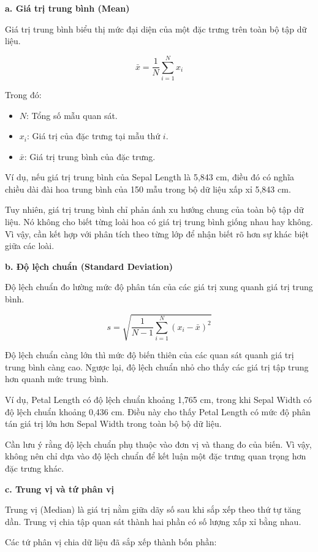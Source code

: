 \documentclass[14pt]{extarticle}
\begin{document}
	\textbf{a. Giá trị trung bình (Mean)}
	
	Giá trị trung bình biểu thị mức đại diện của một đặc trưng trên toàn bộ tập dữ liệu.
	
	\[
	\bar{x}=\frac{1}{N}\sum_{i=1}^{N}x_i
	\]
	
	Trong đó:
	
	\begin{itemize}
		\item $N$: Tổng số mẫu quan sát.
		\item $x_i$: Giá trị của đặc trưng tại mẫu thứ $i$.
		\item $\bar{x}$: Giá trị trung bình của đặc trưng.
	\end{itemize}
	
	Ví dụ, nếu giá trị trung bình của Sepal Length là 5,843 cm, điều đó có nghĩa chiều dài đài hoa trung bình của 150 mẫu trong bộ dữ liệu xấp xỉ 5,843 cm.
	
	Tuy nhiên, giá trị trung bình chỉ phản ánh xu hướng chung của toàn bộ tập dữ liệu. Nó không cho biết từng loài hoa có giá trị trung bình giống nhau hay không. Vì vậy, cần kết hợp với phân tích theo từng lớp để nhận biết rõ hơn sự khác biệt giữa các loài.
	
	\textbf{b. Độ lệch chuẩn (Standard Deviation)}
	
	Độ lệch chuẩn đo lường mức độ phân tán của các giá trị xung quanh giá trị trung bình.
	
	\[
	s=\sqrt{
		\frac{1}{N-1}
		\sum_{i=1}^{N}(x_i-\bar{x})^2
	}
	\]
	
	Độ lệch chuẩn càng lớn thì mức độ biến thiên của các quan sát quanh giá trị trung bình càng cao. Ngược lại, độ lệch chuẩn nhỏ cho thấy các giá trị tập trung hơn quanh mức trung bình.
	
	Ví dụ, Petal Length có độ lệch chuẩn khoảng 1,765 cm, trong khi Sepal Width có độ lệch chuẩn khoảng 0,436 cm. Điều này cho thấy Petal Length có mức độ phân tán giá trị lớn hơn Sepal Width trong toàn bộ bộ dữ liệu.
	
	Cần lưu ý rằng độ lệch chuẩn phụ thuộc vào đơn vị và thang đo của biến. Vì vậy, không nên chỉ dựa vào độ lệch chuẩn để kết luận một đặc trưng quan trọng hơn đặc trưng khác.
	
	\textbf{c. Trung vị và tứ phân vị}
	
	Trung vị (Median) là giá trị nằm giữa dãy số sau khi sắp xếp theo thứ tự tăng dần. Trung vị chia tập quan sát thành hai phần có số lượng xấp xỉ bằng nhau.
	
	Các tứ phân vị chia dữ liệu đã sắp xếp thành bốn phần:
	
\end{document}

